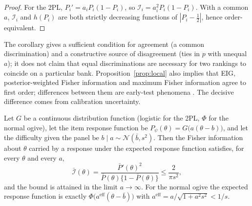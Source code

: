 \begin{proof}
For the 2PL, $P_i'=a_iP_i(1-P_i)$, so $\mathcal I_i=a_i^2P_i(1-P_i)$. With a common
$a$, $\mathcal I_i$ and $h(P_i)$ are both strictly decreasing functions of
$|P_i-\frac12|$, hence order-equivalent.
\end{proof}

The corollary gives a sufficient condition for agreement (a common discrimination) and
a constructive source of disagreement (ties in $p$ with unequal $a$); it does not claim
that equal discriminations are necessary for two rankings to coincide on a particular
bank. Proposition~\ref{prop:local} also implies that EIG, posterior-weighted Fisher
information and maximum Fisher information agree to first order; differences between
them are early-test phenomena \citep{chen2000comparison}. The decisive difference comes
from calibration uncertainty.

\begin{proposition}\label{prop:cap}
Let $G$ be a continuous distribution function (logistic for the 2PL, $\Phi$ for the
normal ogive), let the item response function be $P_\psi(\theta)=G\big(a(\theta-b)\big)$,
and let the difficulty given the panel be $b\mid a\sim\mathcal N(\bar b,s^2)$. Then the
Fisher information about $\theta$ carried by a response under the expected response
function satisfies, for every $\theta$ and every $a$,
\begin{equation}\label{eq:cap}
\bar{\mathcal I}(\theta)=\frac{\bar P'(\theta)^2}{\bar P(\theta)\{1-\bar P(\theta)\}}\le\frac{2}{\pi s^2},
\end{equation}
and the bound is attained in the limit $a\to\infty$. For the normal ogive the expected
response function is exactly $\Phi\big(a^{\mathrm{eff}}(\theta-\bar b)\big)$ with
$a^{\mathrm{eff}}=a/\sqrt{1+a^2s^2}<1/s$.
\end{proposition}

